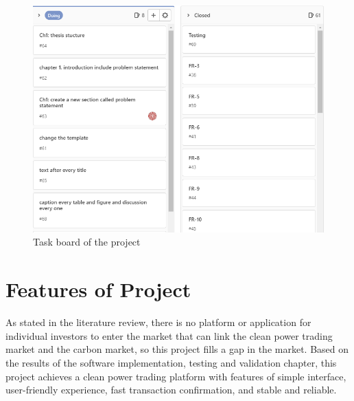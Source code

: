 \begin{figure}[H]
    \centering
    \includegraphics[width= .6 \textwidth]{img/board.png}
    \caption{Task board of the project}
    \label{fig:board}
\end{figure}

\section{Features of Project}
As stated in the literature review, there is no platform or application for individual investors to enter the market that can link the clean power trading market and the carbon market, so this project fills a gap in the market. Based on the results of the software implementation, testing and validation chapter, this project achieves a clean power trading platform with features of simple interface, user-friendly experience, fast transaction confirmation, and stable and reliable.